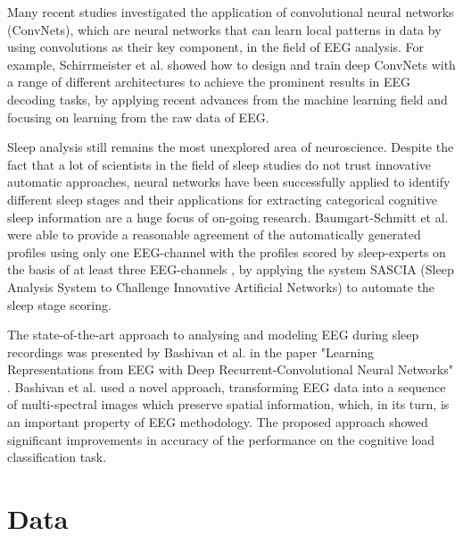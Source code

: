 \documentclass{article}
\begin{document}
Many recent studies \cite{cecotti, shamwell,driver} investigated the application of convolutional neural networks (ConvNets), which are neural networks that can learn local patterns in data by using convolutions as their key component, in the field of EEG analysis. For example, Schirrmeister et al. \cite{schirrmeister} showed how to design and train deep ConvNets with a range of different architectures to achieve the prominent results in EEG decoding tasks, by applying recent advances from the machine learning field and focusing on learning from the raw data of EEG.

Sleep analysis still remains the most unexplored area of neuroscience. Despite the fact that a lot of scientists in the field of sleep studies do not trust innovative automatic approaches, neural networks have been successfully applied to identify different sleep stages \cite{sleep} and their applications for extracting categorical cognitive sleep information are a huge focus of on-going research. Baumgart-Schmitt et al. were able to provide a reasonable agreement of the automatically generated profiles using only one EEG-channel with the profiles scored by sleep-experts on the basis of at least three EEG-channels \cite{somnology}, by applying the system SASCIA (Sleep Analysis System to Challenge Innovative Artificial Networks) to automate the sleep stage scoring. 

The state-of-the-art approach to analysing and modeling EEG during sleep recordings was presented by Bashivan et al. in the paper "Learning Representations from EEG with Deep Recurrent-Convolutional Neural Networks" \cite{learning_eeg_repr}. Bashivan et al. used a novel approach, transforming EEG data into a sequence of multi-spectral images which preserve spatial information, which, in its turn, is an important property of EEG methodology. The proposed approach showed significant improvements in accuracy of the performance on the cognitive load classification task.

\section{Data}
\end{document}
